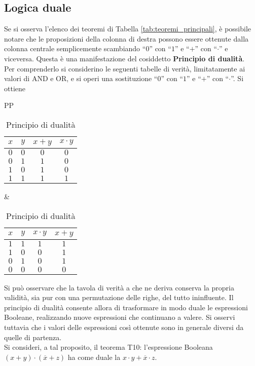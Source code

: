 \documentclass[a4paper]{extarticle}
\newcommand{\quotes}[1]{``#1''}
\begin{document}
\subsection{Logica duale}
Se si osserva l’elenco dei teoremi di Tabella \ref{tab:teoremi_principali}, è possibile notare che le proposizioni della colonna di destra possono essere ottenute dalla colonna centrale semplicemente scambiando \quotes{\(0\)} con \quotes{\(1\)} e \quotes{\(+\)} con \quotes{\(\cdot\)} e viceversa.
Questa è una manifestazione del cosiddetto \textbf{Principio di dualità}.\\
Per comprenderlo si considerino le seguenti tabelle di verità, limitatamente ai valori di AND e OR, e si operi una sostituzione \quotes{\(0\)} con \quotes{\(1\)} e \quotes{\(+\)} con \quotes{\(\cdot\)}. Si ottiene

\begin{table}[H]
    \centering
    \begin{tabularx}{\textwidth}{PP}
        {
            \begin{tabularx}{0.45 \textwidth}{cc|cc}
                 \(x\) & \(y\) & \(x + y\) & \(x \cdot y\)\\
                 \hline
                 \(0\) & \(0\) & \(0\) & \(0\)\\
                 \(0\) & \(1\) & \(1\) & \(0\)\\
                 \(1\) & \(0\) & \(1\) & \(0\)\\
                 \(1\) & \(1\) & \(1\) & \(1\)\\
            \end{tabularx}
        }
        &
        {
            \begin{tabularx}{0.45 \textwidth}{cc|cc}
                 \(x\) & \(y\) & \(x \cdot y\) & \(x + y\)\\
                 \hline
                 \(1\) & \(1\) & \(1\) & \(1\)\\
                 \(1\) & \(0\) & \(0\) & \(1\)\\
                 \(0\) & \(1\) & \(0\) & \(1\)\\
                 \(0\) & \(0\) & \(0\) & \(0\)\\
            \end{tabularx}
        }
    \end{tabularx}
    \caption{Principio di dualità}
    \label{tab:principio_dualita}
\end{table}

\noindent
Si può osservare che la tavola di verità a che ne deriva conserva la propria validità, sia pur con una permutazione delle righe, del tutto ininfluente. Il principio di dualità consente allora di trasformare in modo duale le espressioni Booleane, realizzando nuove espressioni che continuano a valere. Si osservi tuttavia che i valori delle espressioni così ottenute sono in generale diversi da quelle di partenza.\\
Si consideri, a tal proposito, il teorema T10: l’espressione Booleana \((x + y) \cdot (\overline{x} + z)\) ha come duale la \(x \cdot y + \overline{x} \cdot z\).
\end{document}
